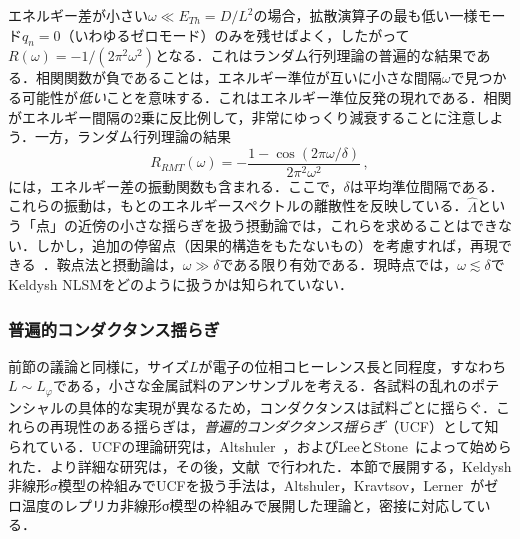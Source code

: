 \documentclass[a4paper,11pt]{ltjsarticle}
\begin{document}
エネルギー差が小さい$\omega\ll E_{Th}=D/L^{2}$の場合，拡散演算子の最も低い一様モード$q_{n}=0$（いわゆるゼロモード）のみを残せばよく，したがって$R(\omega)=
-1/(2\pi^2\omega^2)$となる．これはランダム行列理論の普遍的な結果である．相関関数が負であることは，エネルギー準位が互いに小さな間隔$\omega$で見つかる可能性が{\em 低い}ことを意味する．これはエネルギー準位反発の現れである．相関がエネルギー間隔の2乗に反比例して，非常にゆっくり減衰することに注意しよう．一方，ランダム行列理論の結果~\cite{Mehta}
\begin{equation}
R_{RMT}(\omega)=-\frac{1-\cos(2\pi\omega/\delta)}{2\pi^2\omega^2}\,,
\end{equation}
には，エネルギー差の振動関数も含まれる．ここで，$\delta$は平均準位間隔である．これらの振動は，もとのエネルギースペクトルの離散性を反映している．$\hat{\Lambda}$という「点」の近傍の小さな揺らぎを扱う摂動論では，これらを求めることはできない．しかし，追加の停留点（因果的構造をもたないもの）を考慮すれば，再現できる~\cite{AltlandKamenev}．鞍点法と摂動論は，$\omega\gg
\delta$である限り有効である．現時点では，$\omega\lesssim \delta$でKeldysh NLSMをどのように扱うかは知られていない．




\subsubsection{普遍的コンダクタンス揺らぎ}\label{Part-II-3}



前節の議論と同様に，サイズ$L$が電子の位相コヒーレンス長と同程度，すなわち$L\sim L_{\varphi}$である，小さな金属試料のアンサンブルを考える．各試料の乱れのポテンシャルの具体的な実現が異なるため，コンダクタンスは試料ごとに揺らぐ．これらの再現性のある揺らぎは，{\em 普遍的コンダクタンス揺らぎ}（UCF）として知られている．UCFの理論研究は，Altshuler~\cite{Altshuler-UCF}，およびLeeとStone~\cite{LeeStone}によって始められた．より詳細な研究は，その後，文献~\cite{AltshulerShklovskii,LeeStoneFukuyama}で行われた．本節で展開する，Keldysh非線形$\sigma$模型の枠組みでUCFを扱う手法は，Altshuler，Kravtsov，Lerner~\cite{AKL-UCF}がゼロ温度のレプリカ非線形σ模型の枠組みで展開した理論と，密接に対応している．
\end{document}
